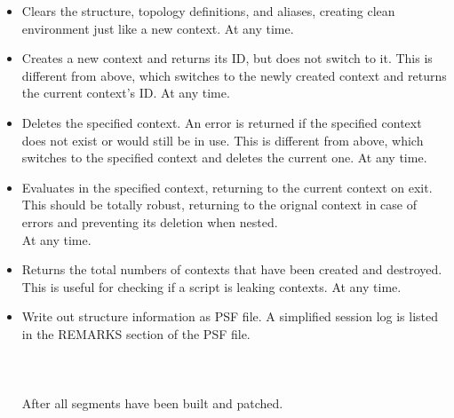 \begin{itemize}
\item {}
{Clears the structure, topology definitions, and aliases, creating
clean environment just like a new context.}
{}
{At any time.}

\item {}
{Creates a new context and returns its ID, but does not switch to it.
This is different from  above, which switches to
the newly created context and returns the current context's ID.}
{}
{At any time.}

\item {}
{Deletes the specified context.  An error is returned if the
specified context does not exist or would still be in use.
This is different from  above,
which switches to the specified context and deletes the current one.}
{}
{At any time.}

\item {}
{Evaluates  in the specified context, returning to the current
context on exit.  This should be totally robust, returning to the orignal
context in case of errors and preventing its deletion when nested.}
{\\
}
{At any time.}

\item {}
{Returns the total numbers of contexts that have been created and destroyed.
This is useful for checking if a script is leaking contexts.}
{}
{At any time.}

\item {}
{Write out structure information as PSF file. A simplified session log is listed in the REMARKS 
section of the PSF file.}
{ \\
\\
\\
\\
}
{After all segments have been built and patched.}


\end{itemize}
